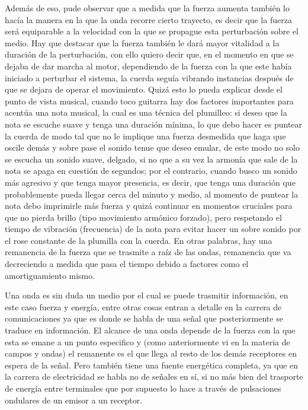 \documentclass[11pt]{article}
\begin{document}
\begin{multicols}{2}
		 Además de eso, pude observar que a medida que la fuerza aumenta también lo hacía la manera en la que la onda recorre cierto trayecto, es decir que la fuerza será equiparable a la velocidad con la que se propague esta perturbación sobre el medio. Hay que destacar que la fuerza también le dará mayor vitalidad a la duración de la perturbación, con ello quiero decir que, en el momento en que se dejaba de dar marcha al motor, dependiendo de la fuerza con la que este había iniciado a perturbar el sistema, la cuerda seguía vibrando instancias después de que se dejara de operar el movimiento. Quizá esto lo pueda explicar desde el punto de vista musical, cuando toco guitarra hay dos factores importantes para acentúa una nota musical, la cual es una técnica del plumilleo: si deseo que la nota se escuche suave y tenga una duración mínima, lo que debo hacer es puntear la cuerda de modo tal que no le implique una fuerza desmedida que haga que oscile demás y sobre pase el sonido tenue que deseo emular, de este modo no solo se escucha un sonido suave, delgado, si no que a su vez la armonía que sale de la nota se apaga en cuestión de segundos; por el contrario, cuando busco un sonido más agresivo y que tenga mayor presencia,  es decir, que tenga una duración que probablemente pueda llegar cerca del minuto y medio, al momento de puntear la nota debo imprimirle más fuerza y quizá continuar en momentos cruciales para que no pierda brillo (tipo movimiento armónico forzado), pero respetando el tiempo de vibración (frecuencia) de la nota para evitar hacer un sobre sonido por el rose constante de la plumilla con la cuerda. En otras palabras, hay una remanencia de la fuerza que se trasmite a raíz de las ondas, remanencia que va decreciendo a medida que pasa el tiempo debido a factores como el amortiguamiento mismo.
		 
		Una onda es sin duda un medio por el cual se puede trasmitir información, en este caso fuerza y energía, entre otras cosas entran a detalle en la carrera de comunicaciones ya que es donde se habla de una señal que posteriormente se traduce en información. El alcance de una onda depende de la fuerza con la que esta se emane a un punto especifico y (como anteriormente vi en la materia de campos y ondas) el remanente es el que llega al resto de los demás receptores en espera de la señal. Pero también tiene una fuente energética completa, ya que en la carrera de electricidad se habla no de señales en sí, si no más bien del trasporte de energía entre terminales que por supuesto lo hace a través de pulsaciones ondulares de un emisor a un receptor. 


\end{multicols}
\end{document}
